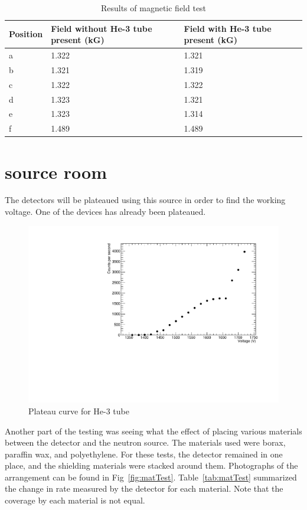 \begin{table}[ht]
	\centering
	\begin{tabular}{ lll }
		Position & Field without He-3 tube present (kG) & Field with He-3 tube present (kG) 	\\ \hline \hline
		a & 1.322 & 1.321 \\			
		b & 1.321 & 1.319 \\			
		c & 1.322 & 1.322 \\			
		d & 1.323 & 1.321 \\				
		e & 1.323 & 1.314 \\		
		f & 1.489 & 1.489 \\		\hline	
	\end{tabular}
	\caption{Results of magnetic field test}
	\label{tab:magField}
\end{table}


\clearpage
\section{source room}

	The detectors will be plateaued using this source in order to find the working voltage. One of the devices has already been plateaued.

\begin{figure}[htb]
	\centerfloat
	\includegraphics[width=6in]{images/Plateau}
	\caption{Plateau curve for He-3 tube}	
	\label{fig:PlateauCurve}
\end{figure}


Another part of the testing was seeing what the effect of placing various materials between the detector and the neutron source. The materials used were borax, paraffin wax, and polyethylene. For these tests, the detector remained in one place, and the shielding materials were stacked around them. Photographs of the arrangement can be found in Fig~\ref{fig:matTest}. Table~\ref{tab:matTest} summarized the change in rate measured by the detector for each material. Note that the coverage by each material is not equal.

